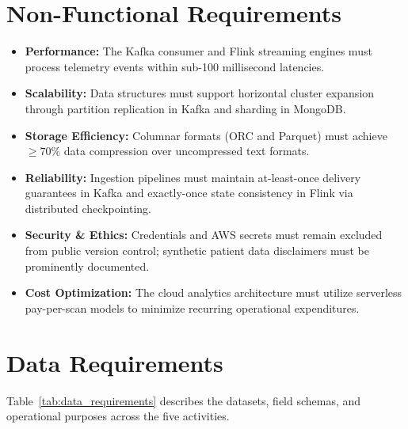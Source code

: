\documentclass[12pt,a4paper]{report}
\begin{document}
\section{Non-Functional Requirements}
\begin{itemize}
    \item \textbf{Performance:} The Kafka consumer and Flink streaming engines must process telemetry events within sub-100 millisecond latencies.
    \item \textbf{Scalability:} Data structures must support horizontal cluster expansion through partition replication in Kafka and sharding in MongoDB.
    \item \textbf{Storage Efficiency:} Columnar formats (ORC and Parquet) must achieve $\ge 70\%$ data compression over uncompressed text formats.
    \item \textbf{Reliability:} Ingestion pipelines must maintain at-least-once delivery guarantees in Kafka and exactly-once state consistency in Flink via distributed checkpointing.
    \item \textbf{Security \& Ethics:} Credentials and AWS secrets must remain excluded from public version control; synthetic patient data disclaimers must be prominently documented.
    \item \textbf{Cost Optimization:} The cloud analytics architecture must utilize serverless pay-per-scan models to minimize recurring operational expenditures.
\end{itemize}

\section{Data Requirements}
Table~\ref{tab:data_requirements} describes the datasets, field schemas, and operational purposes across the five activities.
\end{document}
